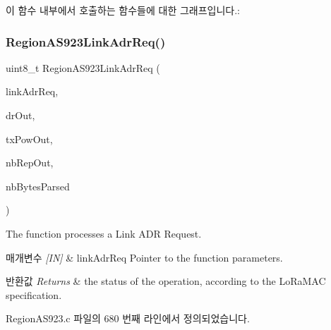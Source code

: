 이 함수 내부에서 호출하는 함수들에 대한 그래프입니다.\+:
\mbox{\label{group___r_e_g_i_o_n_a_s923_ga154ccc00c27ca878e07cfeab3716523a}} 
\subsubsection{\texorpdfstring{Region\+A\+S923\+Link\+Adr\+Req()}{RegionAS923LinkAdrReq()}}
{\footnotesize\ttfamily uint8\+\_\+t Region\+A\+S923\+Link\+Adr\+Req (\begin{DoxyParamCaption}\item[{\mbox{\hyperlink{group___r_e_g_i_o_n_gad4af503e8d4de1846129e26a799a1e8e}{Link\+Adr\+Req\+Params\+\_\+t}} $\ast$}]{link\+Adr\+Req,  }\item[{int8\+\_\+t $\ast$}]{dr\+Out,  }\item[{int8\+\_\+t $\ast$}]{tx\+Pow\+Out,  }\item[{uint8\+\_\+t $\ast$}]{nb\+Rep\+Out,  }\item[{uint8\+\_\+t $\ast$}]{nb\+Bytes\+Parsed }\end{DoxyParamCaption})}



The function processes a Link A\+DR Request. 


\begin{DoxyParams}{매개변수}
{\em \mbox{[}\+I\+N\mbox{]}} & link\+Adr\+Req Pointer to the function parameters.\\
\hline
\end{DoxyParams}

\begin{DoxyRetVals}{반환값}
{\em Returns} & the status of the operation, according to the Lo\+Ra\+M\+AC specification. \\
\hline
\end{DoxyRetVals}


Region\+A\+S923.\+c 파일의 680 번째 라인에서 정의되었습니다.


